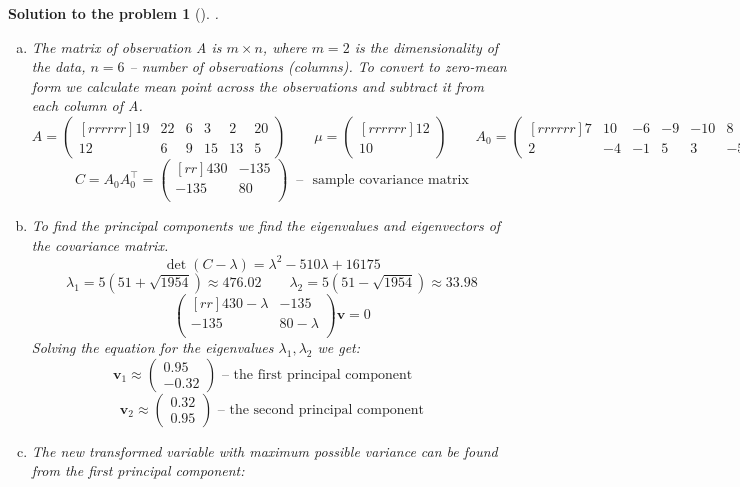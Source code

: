 \documentclass[12pt,a4]{article}
\newtheorem{solution}{Solution to the problem}
\newcommand{\bv}{{\mathbf v}}
\begin{document}
\begin{solution}[] \rm .
\begin{enumerate}[(a)]
  \item The matrix of observation A is $m\times n$, where $m=2$ is the dimensionality of the data, $n=6$ -- number of observations (columns). To convert to zero-mean form we calculate mean point across the observations and subtract it from each column of A.
\[
A = \begin{pmatrix}[rrrrrr]
19 & 22 & 6 & 3 & 2 & 20\\
12 & 6 & 9 & 15 & 13 & 5
\end{pmatrix}
\qquad
\mu = \begin{pmatrix}[rrrrrr]
12 \\ 10
\end{pmatrix}
\qquad
A_0 = \begin{pmatrix}[rrrrrr]
7 & 10 & -6 & -9 & -10 & 8 \\
2 & -4 & -1 & 5 &  3 & -5
\end{pmatrix}
\]
\[
C = A_0 A_0^\top = \begin{pmatrix}[rr]
 430 & -135 \\
-135 &   80 \\
 \end{pmatrix} ~\text{ -- ~sample covariance matrix}
\]
  \item To find the principal components we find the eigenvalues and eigenvectors of the covariance matrix.
\[
\det(C-\lambda) = \lambda^2 - 510 \lambda + 16175
\]
\[
\lambda_1 = 5\left(51+\sqrt{1954}\right) \approx 476.02
\qquad
\lambda_2 = 5\left(51-\sqrt{1954}\right) \approx 33.98
\]
\[
\begin{pmatrix}[rr]
 430-\lambda & -135 \\
-135 &   80-\lambda \\
\end{pmatrix}
\bv = 0
\]
Solving the equation for the eigenvalues $\lambda_1, \lambda_2$ we get:
\[
\bv_1 \approx \begin{pmatrix}0.95 \\-0.32\end{pmatrix}
\text{ -- the first principal component~~~~}
\]
\[
\bv_2 \approx \begin{pmatrix}0.32 \\ 0.95\end{pmatrix}
\text{ -- the second principal component}
\]
  \item The new transformed variable with maximum possible variance can be found from the first principal component:

\end{enumerate}
\end{solution}
\end{document}
